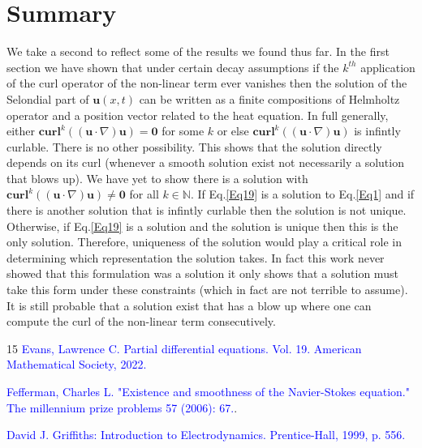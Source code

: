 \documentclass[amsmath,12pt,a4paper]{amsart}
\begin{document}
\section{Summary}
We take a second to reflect some of the results we found thus far. In the first section we have shown that under certain decay assumptions if the $k^{th}$ application of the curl operator of the non-linear term ever vanishes then the solution of the Selondial part of $\textbf{u}(x,t)$ can be written as a finite compositions of Helmholtz operator and a position vector related to the heat equation. In full generally, either $\textbf{curl}^k((\textbf{u}\cdot \nabla)\textbf{u}) = \textbf{0}$ for some $k$ or else $\textbf{curl}^k((\textbf{u}\cdot \nabla)\textbf{u})$ is infintly curlable. There is no other possibility.  This shows that the solution directly depends on its curl (whenever a smooth solution exist not necessarily a solution that blows up). We have yet to show there is a solution with $\textbf{curl}^k((\textbf{u}\cdot \nabla)\textbf{u}) \neq \textbf{0}$  for all $k\in \mathbb{N}$. If Eq.\eqref{Eq19} is a solution to Eq.\eqref{Eq1} and if there is another solution that is infintly curlable then the solution is not unique. Otherwise, if Eq.\eqref{Eq19} is a solution and the solution is unique then this is the only solution. Therefore, uniqueness of the solution would play a critical role in determining which representation the solution takes. In fact this work never showed that this formulation was a solution it only shows that a solution must take this form under these constraints (which in fact are not terrible to assume). It is still probable that a solution exist that has a blow up where one can compute the curl of the non-linear term consecutively.\\



\newpage

\begin{thebibliography}{15}
 \textcolor{blue}{Evans, Lawrence C. Partial differential equations. Vol. 19. American Mathematical Society, 2022.}

 \textcolor{blue}{Fefferman, Charles L. "Existence and smoothness of the Navier-Stokes equation." The millennium prize problems 57 (2006): 67.}.

 \textcolor{blue}{David J. Griffiths: Introduction to Electrodynamics. Prentice-Hall, 1999, p. 556.}
\end{thebibliography}
\end{document}
